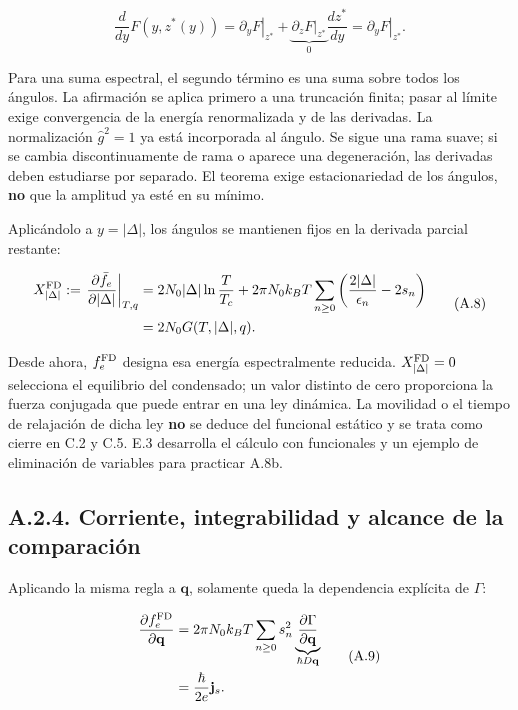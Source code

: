 \documentclass[
  spanish,
  10pt,
  a4paper,
]{article}
\begin{document}
\[
\frac{d}{dy}F(y,z^*(y))
=\left.\partial_yF\right|_{z^*}
+\underbrace{\left.\partial_zF\right|_{z^*}}_{0}
\frac{dz^*}{dy}
=\left.\partial_yF\right|_{z^*}.
\tag{A.8b}
\]

Para una suma espectral, el segundo término es una suma sobre todos los
ángulos. La afirmación se aplica primero a una truncación finita; pasar
al límite exige convergencia de la energía renormalizada y de las
derivadas. La normalización \(\hat g^2=1\) ya está incorporada al
ángulo. Se sigue una rama suave; si se cambia discontinuamente de rama o
aparece una degeneración, las derivadas deben estudiarse por separado.
El teorema exige estacionariedad de los ángulos, \textbf{no} que la
amplitud ya esté en su mínimo.

Aplicándolo a \(y=|\Delta|\), los ángulos se mantienen fijos en la
derivada parcial restante:

\[
\begin{aligned}
X_{|\Delta|}^{\rm FD}
:=\left.\frac{\partial\bar f_e}{\partial|\Delta|}\right|_{T,q}
&=2N_0|\Delta|\ln\frac{T}{T_c}
+2\pi N_0k_BT\sum_{n\geq0}
\left(\frac{2|\Delta|}{\epsilon_n}-2s_n\right)\\
&=2N_0G(T,|\Delta|,q).
\end{aligned}
\tag{A.8}
\]

Desde ahora, \(f_e^{\rm FD}\) designa esa energía espectralmente
reducida. \(X_{|\Delta|}^{\rm FD}=0\) selecciona el equilibrio del
condensado; un valor distinto de cero proporciona la fuerza conjugada
que puede entrar en una ley dinámica. La movilidad o el tiempo de
relajación de dicha ley \textbf{no} se deduce del funcional estático y
se trata como cierre en C.2 y C.5. E.3 desarrolla el cálculo con
funcionales y un ejemplo de eliminación de variables para practicar
A.8b.

\subsection{A.2.4. Corriente, integrabilidad y alcance de la
comparación}\label{a.2.4.-corriente-integrabilidad-y-alcance-de-la-comparaciuxf3n}

Aplicando la misma regla a \(\mathbf q\), solamente queda la dependencia
explícita de \(\Gamma\):

\[
\begin{aligned}
\frac{\partial f_e^{\rm FD}}{\partial\mathbf q}
&=2\pi N_0k_BT\sum_{n\geq0}s_n^2
\underbrace{\frac{\partial\Gamma}{\partial\mathbf q}}_{\hbar D\mathbf q}\\
&=\frac{\hbar}{2e}\mathbf j_s.
\end{aligned}
\tag{A.9}
\]
\end{document}
